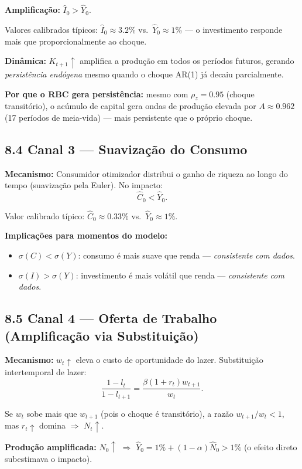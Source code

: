 \documentclass[12pt, a4paper]{article}
\begin{document}
\textbf{Amplificação:} $\hat{I}_0 > \hat{Y}_0$.

Valores calibrados típicos: $\hat{I}_0 \approx 3.2\%$ vs.\ $\hat{Y}_0 \approx 1\%$ --- o investimento responde mais que proporcionalmente ao choque.

\textbf{Dinâmica:} $K_{t+1}\uparrow$ amplifica a produção em todos os períodos futuros, gerando \emph{persistência endógena} mesmo quando o choque AR(1) já decaiu parcialmente.

\textbf{Por que o RBC gera persistência:} mesmo com $\rho_z = 0.95$ (choque transitório), o acúmulo de capital gera ondas de produção elevada por $A \approx 0.962$ (17 períodos de meia-vida) --- mais persistente que o próprio choque.

\subsection*{8.4 Canal 3 --- Suavização do Consumo}

\textbf{Mecanismo:} Consumidor otimizador distribui o ganho de riqueza ao longo do tempo (suavização pela Euler). No impacto:
\[
\hat{C}_0 < \hat{Y}_0.
\]

Valor calibrado típico: $\hat{C}_0 \approx 0.33\%$ vs.\ $\hat{Y}_0 \approx 1\%$.

\textbf{Implicações para momentos do modelo:}
\begin{itemize}
\item $\sigma(C) < \sigma(Y)$: consumo é mais suave que renda --- \emph{consistente com dados}.
\item $\sigma(I) > \sigma(Y)$: investimento é mais volátil que renda --- \emph{consistente com dados}.
\end{itemize}

\subsection*{8.5 Canal 4 --- Oferta de Trabalho (Amplificação via Substituição)}

\textbf{Mecanismo:} $w_t\uparrow$ eleva o custo de oportunidade do lazer. Substituição intertemporal de lazer:
\[
\frac{1-l_t}{1-l_{t+1}} = \frac{\beta(1+r_t)w_{t+1}}{w_t}.
\]

Se $w_t$ sobe mais que $w_{t+1}$ (pois o choque é transitório), a razão $w_{t+1}/w_t < 1$, mas $r_t\uparrow$ domina $\Rightarrow$ $N_t\uparrow$.

\textbf{Produção amplificada:} $\hat{N}_0\uparrow$ $\Rightarrow$ $\hat{Y}_0 = 1\% + (1-\alpha)\hat{N}_0 > 1\%$ (o efeito direto subestimava o impacto).
\end{document}
